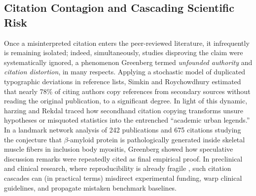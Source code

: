 \documentclass[journal]{IEEEtran}
\begin{document}
\subsection{Citation Contagion and Cascading Scientific Risk}
Once a misinterpreted citation enters the peer-reviewed literature, it infrequently is remaining isolated; indeed, simultaneously, studies disproving the claim were systematically ignored, a phenomenon Greenberg termed \emph{unfounded authority} and \emph{citation distortion}, in many respects. Applying a stochastic model of duplicated typographic deviations in reference lists, Simkin and Roychowdhury \cite{simkin2003read} estimated that nearly 78\% of citing authors copy references from secondary sources without reading the original publication, to a significant degree. In light of this dynamic, harzing \cite{harzing2002referencing} and Rekdal \cite{rekdal2014sinking,rekdal2014urban} traced how secondhand citation copying transforms unsure hypotheses or misquoted statistics into the entrenched ``academic urban legends.'' In a landmark network analysis of 242 publications and 675 citations studying the conjecture that $\beta$-amyloid protein is pathologically generated inside skeletal muscle fibers in inclusion body myositis, Greenberg \cite{greenberg2009citation} showed how speculative discussion remarks were repeatedly cited as final empirical proof. In preclinical and clinical research, where reproducibility is already fragile \cite{ioannidis2005why,begley2012raise}, such citation cascades can (in practical terms) misdirect experimental funding, warp clinical guidelines, and propagate mistaken benchmark baselines.
\end{document}
